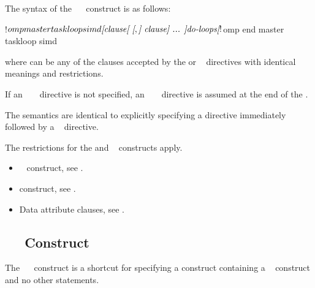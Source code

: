 \begin{fortranspecific}
The syntax of the ~~ construct is as follows:

\begin{ompfPragma}
!$omp master taskloop simd \plc{[clause[ [},\plc{] clause] ... ]}
    \plc{do-loops}
\plc{[}!$omp end master taskloop simd\plc{]}
\end{ompfPragma}

where  can be any of the clauses accepted by the  or
~ directives with identical meanings and restrictions.

If an ~ ~ directive is not 
specified, an ~ ~ directive 
is assumed at the end of the .
\end{fortranspecific}

\descr
The semantics are identical to explicitly specifying a  directive 
immediately followed by a ~ directive. 

\restrictions
The restrictions for the  and ~ 
constructs apply.

\crossreferences
\begin{itemize}
\item {}~ construct, see
.

\item {} construct, see
.

\item Data attribute clauses, see
.
\end{itemize}




\subsection{~~ Construct}
\label{subsec:parallel master taskloop Construct}

\summary
The ~~ construct is a shortcut for 
specifying a  construct containing a ~
construct and no other statements.

